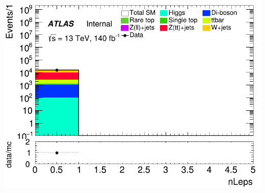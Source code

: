 \documentclass[usenames,dvipsnames]{beamer}
\begin{document}
\begin{frame}
\begin{minipage}{0.32\textwidth}
        \includegraphics[width=\textwidth]{graphics/HH_met/HH_met_nLeps.png}
    \end{minipage}
    
    \vspace{0.5cm} %


\end{frame}
\end{document}
